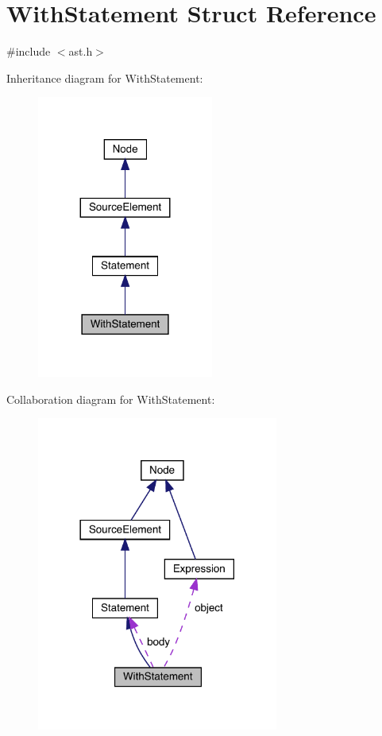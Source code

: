 \hypertarget{struct_with_statement}{}\section{With\+Statement Struct Reference}
\label{struct_with_statement}


{\ttfamily \#include $<$ast.\+h$>$}



Inheritance diagram for With\+Statement\+:\nopagebreak
\begin{figure}[H]
\begin{center}
\leavevmode
\includegraphics[width=164pt]{struct_with_statement__inherit__graph}
\end{center}
\end{figure}


Collaboration diagram for With\+Statement\+:\nopagebreak
\begin{figure}[H]
\begin{center}
\leavevmode
\includegraphics[width=225pt]{struct_with_statement__coll__graph}
\end{center}
\end{figure}
